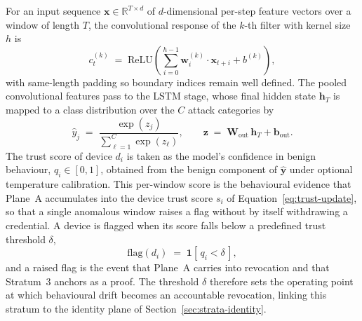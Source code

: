 For an input sequence $\mathbf{x} \in \mathbb{R}^{T \times d}$ of $d$-dimensional per-step feature vectors over a window of length $T$, the convolutional response of the $k$-th filter with kernel size $h$ is
\begin{equation}
\label{eq:strata-conv}
c_t^{(k)} \;=\; \mathrm{ReLU}\!\left( \sum_{i=0}^{h-1} \mathbf{w}_i^{(k)} \cdot \mathbf{x}_{t+i} + b^{(k)} \right),
\end{equation}
with same-length padding so boundary indices remain well defined. The pooled convolutional features pass to the LSTM stage, whose final hidden state $\mathbf{h}_T$ is mapped to a class distribution over the $C$ attack categories by
\begin{equation}
\label{eq:strata-softmax}
\hat{y}_j \;=\; \frac{\exp(z_j)}{\sum_{\ell=1}^{C} \exp(z_\ell)}, \qquad \mathbf{z} \;=\; \mathbf{W}_{\text{out}}\,\mathbf{h}_T + \mathbf{b}_{\text{out}}.
\end{equation}
The trust score of device $d_i$ is taken as the model's confidence in benign behaviour, $q_i \in [0,1]$, obtained from the benign component of $\hat{\mathbf{y}}$ under optional temperature calibration. This per-window score is the behavioural evidence that Plane~A accumulates into the device trust score $s_i$ of Equation~\eqref{eq:trust-update}, so that a single anomalous window raises a flag without by itself withdrawing a credential. A device is flagged when its score falls below a predefined trust threshold $\delta$,
\begin{equation}
\label{eq:strata-flag}
\text{flag}(d_i) \;=\; \mathbf{1}\!\left[\, q_i < \delta \,\right],
\end{equation}
and a raised flag is the event that Plane~A carries into revocation and that Stratum~3 anchors as a proof. The threshold $\delta$ therefore sets the operating point at which behavioural drift becomes an accountable revocation, linking this stratum to the identity plane of Section~\ref{sec:strata-identity}.

